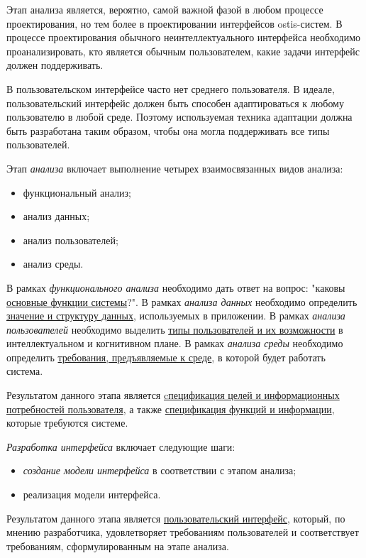 Этап анализа является, вероятно, самой важной фазой в любом процессе проектирования, но тем более в проектировании интерфейсов ostis-систем. В
процессе проектирования обычного неинтеллектуального интерфейса
необходимо проанализировать, кто является обычным пользователем, какие задачи интерфейс должен поддерживать. 

В пользовательском интерфейсе часто нет среднего пользователя.
В идеале, пользовательский интерфейс должен быть способен адаптироваться к любому пользователю в любой среде. Поэтому используемая техника адаптации должна быть разработана таким образом, чтобы она могла поддерживать все типы пользователей.

Этап \textit{анализа} включает выполнение четырех взаимосвязанных видов анализа:
\begin{itemize}
    \item функциональный анализ;
    \item анализ данных;
    \item анализ пользователей;
    \item анализ среды.
\end{itemize}

В рамках \textit{функционального анализа} необходимо дать ответ на вопрос: "каковы \uline{основные функции системы}?".
В рамках \textit{анализа данных} необходимо определить \uline{значение и структуру данных}, используемых в приложении.
В рамках \textit{анализа пользователей} необходимо выделить \uline{типы пользователей и их возможности} в интеллектуальном
и когнитивном плане.
В рамках \textit{анализа среды} необходимо определить \uline{требования, предъявляемые к среде}, в которой будет работать система.

Результатом данного этапа является \uline{cпецификация целей и информационных потребностей пользователя}, а также
\uline{спецификация функций и информации}, которые требуются системе.

\textit{Разработка интерфейса} включает следующие шаги:
\begin{itemize}
	\item \textit{создание модели интерфейса} в соответствии с этапом анализа;
	\item реализация модели интерфейса.
\end{itemize}

Результатом данного этапа является \uline{пользовательский интерфейс}, который, по мнению разработчика, удовлетворяет требованиям пользователей и соответствует требованиям, сформулированным на этапе анализа.

